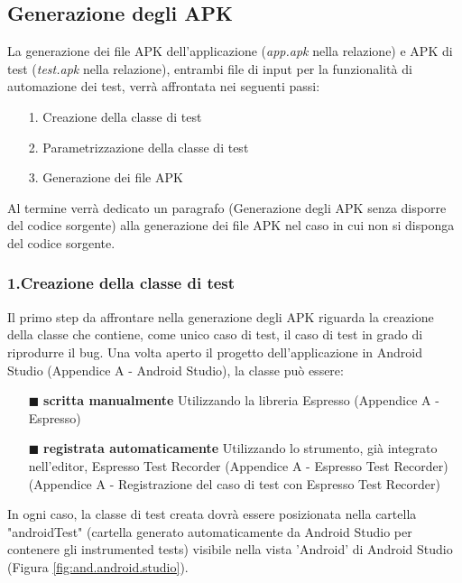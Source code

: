 \subsection*{Generazione degli APK}
\label{genapk}
La generazione dei file APK dell'applicazione (\emph{app.apk} nella relazione) e APK di test (\emph{test.apk} nella relazione), entrambi file di input per la funzionalità di automazione dei test, verrà affrontata nei seguenti passi:
\begin{itemize}[nosep]
\item [1.] Creazione della classe di test 
\item [2.] Parametrizzazione della classe di test
\item [3.] Generazione dei file APK
\end{itemize}
\noindent Al termine verrà dedicato un paragrafo (Generazione degli APK senza disporre del codice sorgente) alla generazione dei file APK nel caso in cui non si disponga del codice sorgente.

\subsubsection*{1.Creazione della classe di test}
\label{creazioneclassetest}
Il primo step da affrontare nella generazione degli APK riguarda la creazione della classe che contiene, come unico caso di test, il caso di test in grado di riprodurre il bug. Una volta aperto il progetto dell'applicazione in Android Studio (Appendice A - Android Studio), la classe può essere:
\begin{itemize}[nosep]
\item [$\blacksquare$]\textbf{scritta manualmente} \newline
Utilizzando la libreria Espresso (Appendice A - Espresso)
\item [$\blacksquare$]\textbf{registrata automaticamente} \newline
Utilizzando lo strumento, già integrato nell’editor, Espresso Test Recorder  (Appendice A - Espresso Test Recorder) (Appendice A - Registrazione del caso di test con Espresso Test Recorder) 
\end{itemize}
In ogni caso, la classe di test creata dovrà essere posizionata nella cartella "androidTest" (cartella generato automaticamente da Android Studio per contenere gli instrumented tests) visibile nella vista 'Android' di Android Studio (Figura \ref{fig:and.android.studio}).


